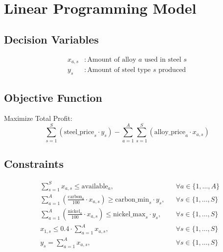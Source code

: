 \documentclass{article}
\begin{document}
\section*{Linear Programming Model}

\subsection*{Decision Variables}
\begin{align*}
x_{a,s} &: \text{Amount of alloy } a \text{ used in steel } s \\
y_s &: \text{Amount of steel type } s \text{ produced}
\end{align*}

\subsection*{Objective Function}
Maximize Total Profit:
\[
\sum_{s=1}^{S} \left( \text{steel\_price}_s \cdot y_s \right) - \sum_{a=1}^{A} \sum_{s=1}^{S} \left( \text{alloy\_price}_a \cdot x_{a,s} \right)
\]

\subsection*{Constraints}
\begin{align*}
&\sum_{s=1}^{S} x_{a,s} \leq \text{available}_a, &&\forall a \in \{1, \ldots, A\} \\
&\sum_{a=1}^{A} \left( \frac{\text{carbon}_a}{100} \cdot x_{a,s} \right) \geq \text{carbon\_min}_s \cdot y_s, &&\forall s \in \{1, \ldots, S\} \\
&\sum_{a=1}^{A} \left( \frac{\text{nickel}_a}{100} \cdot x_{a,s} \right) \leq \text{nickel\_max}_s \cdot y_s, &&\forall s \in \{1, \ldots, S\} \\
&x_{1,s} \leq 0.4 \cdot \sum_{a=1}^{A} x_{a,s}, &&\forall s \in \{1, \ldots, S\} \\
&y_s = \sum_{a=1}^{A} x_{a,s}, &&\forall s \in \{1, \ldots, S\} 
\end{align*}
\end{document}
